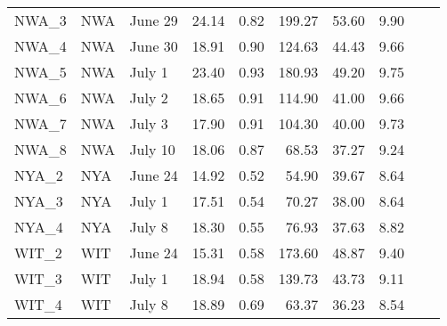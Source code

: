 \begin{longtable}{lllllrrrrr}
  NWA\_3 & NWA & June 29 & 24.14 & 0.82 & 199.27 & 53.60 & 9.90 \\ 
  NWA\_4 & NWA & June 30 & 18.91 & 0.90 & 124.63 & 44.43 & 9.66 \\ 
  NWA\_5 & NWA & July 1 & 23.40 & 0.93 & 180.93 & 49.20 & 9.75 \\ 
  NWA\_6 & NWA & July 2 & 18.65 & 0.91 & 114.90 & 41.00 & 9.66 \\ 
  NWA\_7 & NWA & July 3 & 17.90 & 0.91 & 104.30 & 40.00 & 9.73 \\ 
  NWA\_8 & NWA & July 10 & 18.06 & 0.87 & 68.53 & 37.27 & 9.24 \\ 
  NYA\_2 & NYA & June 24 & 14.92 & 0.52 & 54.90 & 39.67 & 8.64 \\ 
  NYA\_3 & NYA & July 1 & 17.51 & 0.54 & 70.27 & 38.00 & 8.64 \\ 
  NYA\_4 & NYA & July 8 & 18.30 & 0.55 & 76.93 & 37.63 & 8.82 \\ 
  WIT\_2 & WIT & June 24 & 15.31 & 0.58 & 173.60 & 48.87 & 9.40 \\ 
  WIT\_3 & WIT & July 1 & 18.94 & 0.58 & 139.73 & 43.73 & 9.11 \\ 
  WIT\_4 & WIT & July 8 & 18.89 & 0.69 & 63.37 & 36.23 & 8.54 \\ 
   \hline
\end{longtable}
\normal

\normal
